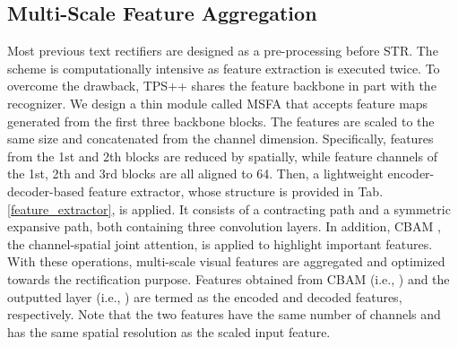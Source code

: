 \documentclass{article}
\begin{document}
\begin{table}[]
\centering
{}
\caption{Structure of the encoder-decoder feature extractor.}
\label{feature_extractor}
\end{table}

\subsection{Multi-Scale Feature Aggregation}
Most previous text rectifiers \cite{shi2016robust_auto_rect,shi2018aster} are designed as a pre-processing before STR. The scheme is computationally intensive as feature extraction is executed twice. To overcome the drawback, TPS++ shares the feature backbone in part with the recognizer. We design a thin module called MSFA that accepts feature maps generated from the first three backbone blocks. The features are scaled to the same size and concatenated from the channel dimension. Specifically, features from the 1st and 2th blocks are reduced by  spatially, while feature channels of the 1st, 2th and 3rd blocks are all aligned to 64. Then, a lightweight encoder-decoder-based feature extractor, whose structure is provided in Tab.\ref{feature_extractor}, is applied. It consists of a contracting path and a symmetric expansive path, both containing three convolution layers. In addition, CBAM \cite{woo2018cbam}, the channel-spatial joint attention, is applied to highlight important features. With these operations, multi-scale visual features are aggregated and optimized towards the rectification purpose. Features obtained from CBAM (i.e., ) and the outputted layer (i.e., ) are termed as the encoded and decoded features, respectively. Note that the two features have the same number of channels and  has the same spatial resolution as the scaled input feature.
\end{document}
